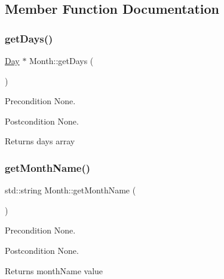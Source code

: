 \subsection{Member Function Documentation}
\hypertarget{class_month_ab562a3d12216892324cfcfb2ba9503a6}{}\label{class_month_ab562a3d12216892324cfcfb2ba9503a6} 
\subsubsection{\texorpdfstring{get\+Days()}{getDays()}}
{\footnotesize\ttfamily \hyperlink{class_day}{Day} $\ast$ Month\+::get\+Days (\begin{DoxyParamCaption}{ }\end{DoxyParamCaption})}

\begin{DoxyPrecond}{Precondition}
None. 
\end{DoxyPrecond}
\begin{DoxyPostcond}{Postcondition}
None. 
\end{DoxyPostcond}
\begin{DoxyReturn}{Returns}
days array 
\end{DoxyReturn}
\hypertarget{class_month_a1cb2ba2c0e646b961f55d99e9f5b74de}{}\label{class_month_a1cb2ba2c0e646b961f55d99e9f5b74de} 
\subsubsection{\texorpdfstring{get\+Month\+Name()}{getMonthName()}}
{\footnotesize\ttfamily std\+::string Month\+::get\+Month\+Name (\begin{DoxyParamCaption}{ }\end{DoxyParamCaption})}

\begin{DoxyPrecond}{Precondition}
None. 
\end{DoxyPrecond}
\begin{DoxyPostcond}{Postcondition}
None. 
\end{DoxyPostcond}
\begin{DoxyReturn}{Returns}
month\+Name value 
\end{DoxyReturn}
\hypertarget{class_month_a5ab8e306d9f603872dcf68b7bc771aa0}{}\label{class_month_a5ab8e306d9f603872dcf68b7bc771aa0} 
